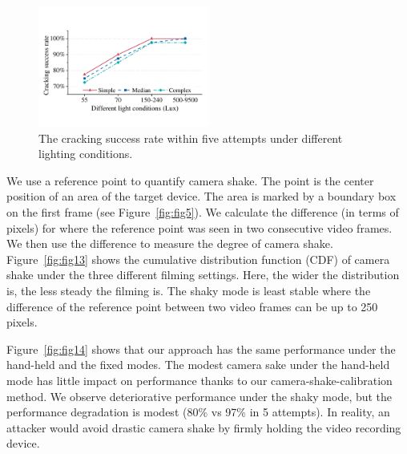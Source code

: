         \begin{figure}[t!]
            \centering
            \includegraphics[width=0.5\textwidth]{fig/light.pdf}
            \caption{The cracking success rate within five attempts under different lighting conditions.}
            \label{fig:light}
        \end{figure}

    We use a reference point to quantify camera shake. The point
    is the center position of an area of the target device. The area is marked by a boundary box on the first
    frame (see Figure~\ref{fig:fig5}). We calculate the difference (in terms of pixels) for where the
    reference point was seen in two consecutive video frames. We then use the difference to measure the degree of camera shake.
    Figure~\ref{fig:fig13} shows the cumulative distribution function (CDF)
    of camera shake under the three different filming settings.
    Here, the wider the distribution is, the less steady the
     filming is. The shaky mode is least stable where the difference of the reference point between two video frames can be up to 250 pixels.


    Figure~\ref{fig:fig14} shows that our approach has the same performance under
    the hand-held and the fixed modes. The modest camera sake under the hand-held mode
    has little impact on performance thanks to our camera-shake-calibration method. We observe deteriorative performance
    under the shaky mode, but the performance degradation is modest (80\% vs 97\%
    in 5 attempts). In reality, an attacker would avoid drastic
    camera shake by firmly holding the video recording device.

